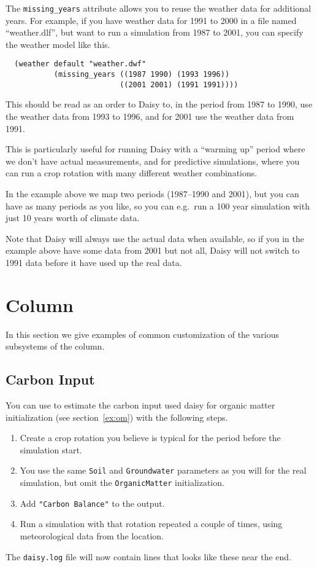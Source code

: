\documentclass[a4paper,11pt]{article}
\begin{document}
The \texttt{missing\_years} attribute allows you to reuse the weather
data for additional years.  For example, if you have weather data for
1991 to 2000 in a file named ``weather.dlf'', but want to run a
simulation from 1987 to 2001, you can specify the weather model like
this.
\begin{verbatim}
  (weather default "weather.dwf"
           (missing_years ((1987 1990) (1993 1996))
                          ((2001 2001) (1991 1991))))
\end{verbatim}
This should be read as an order to Daisy to, in the period from 1987
to 1990, use the weather data from 1993 to 1996, and for 2001 use the
weather data from 1991.

This is particularly useful for running Daisy with a ``warming up''
period where we don't have actual measurements, and for predictive
simulations, where you can run a crop rotation with many different
weather combinations.

In the example above we map two periods (1987--1990 and 2001), but you
can have as many periods as you like, so you can e.g.\ run a 100 year
simulation with just 10 years worth of climate data.

Note that Daisy will always use the actual data when available, so if
you in the example above have some data from 2001 but not all, Daisy
will not switch to 1991 data before it have used up the real data.

\section{Column}
\label{sec:column}

In this section we give examples of common customization of the
various subsystems of the column.

\subsection{Carbon Input}
\label{sec:om}

You can use \daisy{} to estimate the carbon input used daisy{} for
organic matter initialization (see section~\ref{ex:om}) with the
following steps.
\begin{enumerate}
\item Create a crop rotation you believe is typical for the period
  before the simulation start.
\item You use the same \texttt{Soil} and \texttt{Groundwater}
  parameters as you will for the real simulation, but omit the
  \texttt{OrganicMatter} initialization.
\item Add \texttt{"Carbon Balance"} to the output.
\item Run a simulation with that rotation repeated a couple of times,
  using meteorological data from the location.
\end{enumerate}
The \texttt{daisy.log} file will now contain lines that looks like
these near the end.
\end{document}
